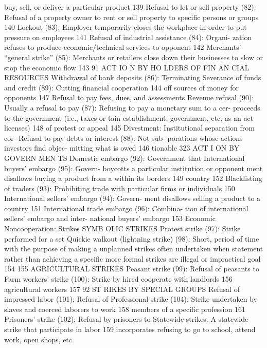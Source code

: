 \documentclass[twoside,a4paper,12pt,fleqn,openany]{extbook}
\begin{document}
buy, sell, or deliver a particular product 139
Refusal to let or sell property (82): Refusal of
a property owner to rent or sell property to
specific persons or groups
 140
Lockout (83): Employer temporarily closes
the workplace in order to put pressure on
employees
 141
Refusal of industrial assistance (84): Organi-
zation refuses to produce economic/technical
services to opponent
 142
Merchants’ “general strike” (85): Merchants
or retailers close down their businesses to slow
or stop the economic flow
 143
91
ACT IO N BY HO LDERS OF FIN AN CIAL RESOURCES
Withdrawal of bank deposits (86): Terminating
 Severance of funds and credit (89): Cutting
financial cooperation
 144
 off sources of money for opponents
 147
Refusal to pay fees, dues, and assessments
 Revenue refusal (90): Usually a refusal to pay
(87): Refusing to pay a monetary sum to a cer-
 proceeds to the government (i.e., taxes or
tain establishment, government, etc. as an act
 licenses)
 148
of protest or appeal
 145
Divestment: Institutional separation from cor-
Refusal to pay debts or interest (88): Not sub-
 porations whose actions investors find objec-
mitting what is owed
 146
 tionable
 323
ACT I ON BY GOVERN MEN TS
Domestic embargo (92): Government that
 International buyers’ embargo (95): Govern-
boycotts a particular institution or opponent
 ment disallows buying a product from a
within its borders
 149
 country
 152
Blacklisting of traders (93): Prohibiting trade
with particular firms or individuals
 150
International sellers’ embargo (94): Govern-
ment disallows selling a product to a country		
151
International trade embargo (96): Combina-
tion of international sellers’ embargo and inter-
national buyers’ embargo
 153
Economic Noncooperation: Strikes
SYMB OLIC STRIKES
Protest strike (97): Strike performed for a set
 Quickie walkout (lightning strike) (98): Short,
period of time with the purpose of making a
 unplanned strikes often undertaken when
statement rather than achieving a specific
 more formal strikes are illegal or impractical		
goal
 154
 155
AGRICULTURAL STRIKES
Peasant strike (99): Refusal of peasants to
 Farm workers’ strike (100): Strike by hired
cooperate with landlords
 156
 agricultural workers
 157
92
ST RIKES BY SPECIAL GROUPS
Refusal of impressed labor (101): Refusal of
 Professional strike (104): Strike undertaken by
slaves and coerced laborers to work
 158
 members of a specific profession
 161
Prisoners’ strike (102): Refusal by prisoners to
 Statewide strikes: A statewide strike that
participate in labor
 159
 incorporates refusing to go to school, attend
work, open shops, etc.
\end{document}
